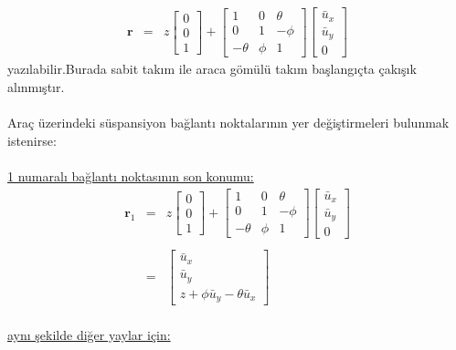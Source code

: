 \documentclass[a4paper]{report}
\begin{document}
\begin{eqnarray*}
\mathbf{r}&=&z\left[\begin{array}{c} 0\\ 0\\ 1\end{array} \right]+\left[\begin{array}{ccc} 1 & 0 & \theta\\ 0 & 1 & - \phi\\ -\theta & \phi & 1 \end{array}\right] \left[\begin{array}{c} \bar{u}_x\\ \bar{u}_y\\ 0\end{array} \right]
\end{eqnarray*}
yazılabilir.Burada sabit takım ile araca gömülü takım başlangıçta çakışık alınmıştır. \\
~\\
Araç üzerindeki süspansiyon bağlantı noktalarının yer değiştirmeleri bulunmak istenirse:\\
~\\
\underline{1 numaralı bağlantı noktasının son konumu:}
\begin{eqnarray*}
\mathbf{r}_1&=&z\left[\begin{array}{c} 0\\ 0\\ 1\end{array} \right]+\left[\begin{array}{ccc} 1 & 0 & \theta\\ 0 & 1 & - \phi\\ -\theta & \phi & 1 \end{array}\right] \left[\begin{array}{c} \bar{u}_x\\ \bar{u}_y\\ 0\end{array} \right]
\\
\\
&=& \left[\begin{array}{c} \bar{u}_{x}\\ \bar{u}_{y}\\ z +\phi \bar{u}_{y} - \theta \bar{u}_{x} \end{array} \right]
\end{eqnarray*}\\
\underline{aynı şekilde diğer yaylar için:}\\
\end{document}
